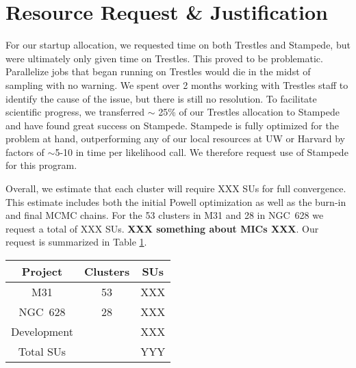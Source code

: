 \documentclass[11pt,preprint]{aastex}
\begin{document}




\section{Resource Request \& Justification}

For our startup allocation, we requested time on both Trestles and Stampede, but were ultimately only given time on Trestles.  This proved to be problematic.  Parallelize jobs that began running on Trestles would die in the midst of sampling with no warning.  We spent over 2 months working with Trestles staff to identify the cause of the issue, but there is still no resolution.  To facilitate scientific progress, we transferred $\sim$ 25\% of our Trestles allocation to Stampede and have found great success on Stampede.  Stampede is fully optimized for the problem at hand, outperforming any of our local resources at UW or Harvard by factors of $\sim$5-10 in time per likelihood call.  We therefore request use of Stampede for this program.

Overall, we estimate that each cluster will require XXX SUs for full convergence.  This estimate includes both the initial Powell optimization as well as the burn-in and final MCMC chains.  For the 53 clusters in M31 and 28 in NGC~628 we request a total of XXX SUs. \textbf{XXX something about MICs XXX}.  Our request is summarized in Table \ref{tab1}.

\begin{table}[h!]
\begin{center}
\begin{tabular}{cc|c}
Project & Clusters & SUs \\
\hline
M31 & 53 & XXX \\
NGC~628 & 28 & XXX \\
Development & & XXX \\
\hline Total SUs & & YYY \\
\hline

\end{tabular}
\end{center}
\label{tab1}
\end{table}%
\end{document}
